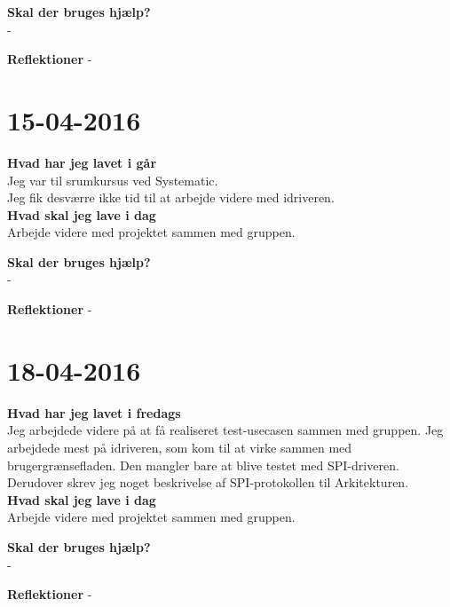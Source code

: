 \documentclass{article}
\begin{document}
	\textbf{Skal der bruges hjælp?}\\
	-
	
	\textbf{Reflektioner}
	-
	
	
	
	\section{15-04-2016}
	
	\textbf{Hvad har jeg lavet i går}\\
	Jeg var til srumkursus ved Systematic.\\
	Jeg fik desværre ikke tid til at arbejde videre med idriveren.\\
	
	\textbf{Hvad skal jeg lave i dag}\\
	Arbejde videre med projektet sammen med gruppen. 
	
	\textbf{Skal der bruges hjælp?}\\
	-
	
	\textbf{Reflektioner}
	-
	
	
	
	\section{18-04-2016}
	
	\textbf{Hvad har jeg lavet i fredags}\\
	Jeg arbejdede videre på at få realiseret test-usecasen sammen med gruppen. Jeg arbejdede mest på idriveren, som kom til at virke sammen med brugergrænsefladen. Den mangler bare at blive testet med SPI-driveren.\\
	Derudover skrev jeg noget beskrivelse af SPI-protokollen til Arkitekturen.\\
	
	\textbf{Hvad skal jeg lave i dag}\\
	Arbejde videre med projektet sammen med gruppen. 
	
	\textbf{Skal der bruges hjælp?}\\
	-
	
	\textbf{Reflektioner}
	-
	
\end{document}
